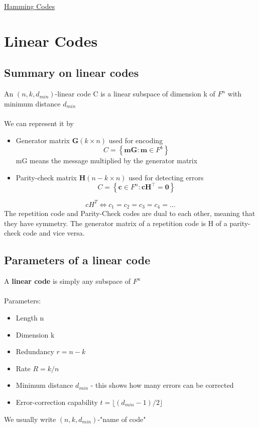 \documentclass{article}[18pt]
\begin{document}
\begin{center}
\underline{\huge Hamming Codes}
\end{center}
\section{Linear Codes}
\subsection{Summary on linear codes}
An $(n,k,d_{min})$-linear code C is a linear subspace of dimension k of $F^n$ with minimum distance $d_{min}$\\
\\
We can represent it by
\begin{itemize}
	\item Generator matrix $\mathbf{G}(k\times n)$ used for encoding 
	$$C = \left\{ \mathbf { m } \mathbf { G } : \mathbf { m } \in F ^ { k } \right\}$$
	mG means the message multiplied by the generator matrix
	\item Parity-check matrix $\mathbf{H}(n-k\times n)$ used for detecting errors
	$$C = \left\{ \mathbf { c } \in F ^ { n } : \mathbf { c H } ^ { \top } = \mathbf { 0 } \right\}$$
\end{itemize}
$$cH^T\Leftrightarrow c_1=c_2=c_3=c_4=...$$
The repetition code and Parity-Check codes are dual to each other, meaning that they have symmetry. The generator matrix of a repetition code is H of a parity-check code and vice versa.
\subsection{Parameters of a linear code}
A \textbf{linear code} is simply any subspace of $F^n$\\
\\
Parameters:
\begin{itemize}
	\item Length n
	\item Dimension k
	\item Redundancy $r=n-k$
	\item Rate $R=k/n$
	\item Minimum distance $d_{min}$ - this shows how many errors can be corrected
	\item Error-correction capability $t=\lfloor (d_{min}-1)/2\rfloor$
\end{itemize}
We usually write $(n,k,d_{min})$-"name of code"
\end{document}
